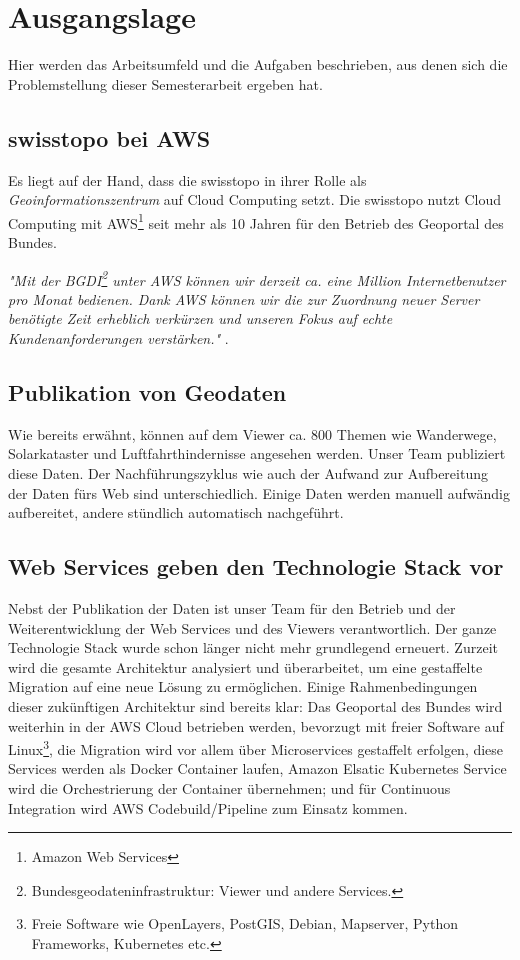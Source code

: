 \section{Ausgangslage}
Hier werden das Arbeitsumfeld und die Aufgaben beschrieben, aus denen sich die Problemstellung dieser Semesterarbeit ergeben hat.

\subsection{swisstopo bei AWS}
Es liegt auf der Hand, dass die swisstopo in ihrer Rolle als \emph{Geoinformationszentrum} auf Cloud Computing setzt. Die swisstopo nutzt Cloud Computing mit AWS\footnote{Amazon Web Services} seit mehr als 10 Jahren für den Betrieb des Geoportal des Bundes.
 
\textit{"Mit der BGDI\footnote{Bundesgeodateninfrastruktur: Viewer und andere Services.} unter AWS können wir derzeit ca. eine Million Internetbenutzer pro Monat bedienen. Dank AWS können wir die zur Zuordnung neuer Server benötigte Zeit erheblich verkürzen und unseren Fokus auf echte Kundenanforderungen verstärken."} \cite{Christ2020}.


\subsection{Publikation von Geodaten}
Wie bereits erwähnt, können auf dem Viewer ca. 800 Themen wie Wanderwege, Solarkataster und Luftfahrthindernisse angesehen werden. Unser Team publiziert diese Daten. Der Nachführungszyklus wie auch der Aufwand zur
Aufbereitung der Daten fürs Web sind unterschiedlich. Einige Daten werden manuell aufwändig aufbereitet, andere
stündlich automatisch nachgeführt.

\subsection{Web Services geben den Technologie Stack vor}\label{kap:webservices}
Nebst der Publikation der Daten ist unser Team für den Betrieb und der Weiterentwicklung der Web Services
und des Viewers verantwortlich. Der ganze Technologie Stack wurde schon länger nicht mehr grundlegend erneuert. Zurzeit wird
die gesamte Architektur analysiert und überarbeitet, um eine gestaffelte Migration auf eine neue
Lösung zu ermöglichen.
Einige Rahmenbedingungen dieser zukünftigen Architektur sind bereits klar: Das Geoportal des
Bundes wird weiterhin in der AWS Cloud betrieben werden, bevorzugt mit freier Software auf Linux\footnote{Freie Software \cite{FS2010} wie OpenLayers, PostGIS, Debian, Mapserver, Python Frameworks, Kubernetes etc.}, die Migration wird vor allem über Microservices gestaffelt erfolgen, diese Services werden als Docker Container laufen, Amazon Elsatic Kubernetes Service wird die Orchestrierung der Container übernehmen; und für Continuous
Integration wird AWS Codebuild/Pipeline zum Einsatz kommen.

